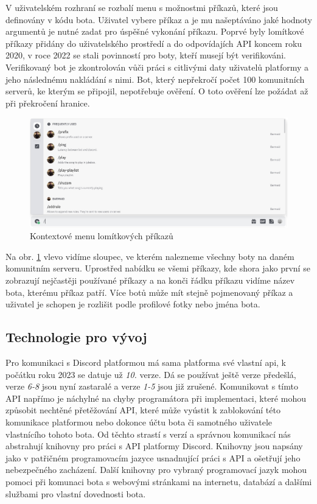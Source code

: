 \documentclass[
  program=inf,
biblatex=false,
sourcecodes=true,
joinlists=true,
  figures=true,
  tables=true,
  glossaries=true,
  index=false
]{kidiplom}
\begin{document}
V uživatelském rozhraní se rozbalí menu s možnostmi příkazů, které jsou definovány v kódu bota. Uživatel vybere příkaz a
je mu našeptáváno jaké hodnoty argumentů je nutné zadat pro úspěšné vykonání
příkazu. Poprvé byly lomítkové příkazy přidány do uživatelského prostředí a do odpovídajích
API koncem roku 2020, v roce 2022 se stali povinností pro boty, kteří musejí
být verifikováni. Verifikovaný bot je zkontrolován vůči práci s citlivými daty uživatelů platformy a jeho
následnému nakládání s nimi. Bot, který
nepřekročí počet 100 komunitních serverů, ke kterým se připojil, nepotřebuje ověření.
O toto ověření lze požádat až při překročení hranice.

\begin{figure}[h]
  \centering \includegraphics[scale=0.48]{slash}
  \caption{\label{slash_command}Kontextové menu lomítkových příkazů}
\end{figure}

Na obr. \ref{slash_command} vlevo vidíme sloupec, ve kterém nalezneme všechny
boty na daném komunitním serveru. Uprostřed nabídku se všemi příkazy, kde shora jako první
se zobrazují nejčastěji používané příkazy a na konči řádku příkazu vidíme název
bota, kterému příkaz patří. Více botů může mít stejně pojmenovaný příkaz a uživatel
je schopen je rozlišit podle profilové fotky nebo jména bota.

\subsection{Technologie pro vývoj}
Pro komunikaci s Discord platformou má sama platforma své vlastní \acrshort{api}, k počátku roku
2023 se datuje už {\it 10.} verze. Dá se používat ještě verze předešlá, verze {\it 6-8} jsou 
nyní zastaralé a verze {\it 1-5} jsou již zrušené. \cite{discordapi} Komunikovat s tímto API
napřímo je náchylné na chyby programátora při implementaci, které mohou způsobit
nechtěné přetěžování API, které může vyústit k zablokování této komunikace platformou
nebo dokonce účtu bota či samotného uživatele vlastnícího tohoto bota. Od těchto strastí
s verzí a správnou komunikací nás abstrahují knihovny pro práci s API platformy Discord.
Knihovny jsou napsány jako  v patřičném programovacím jazyce usnadnující 
práci s API a ošetřují jeho nebezpečného zacházení. Další knihovny pro vybraný programovací
jazyk mohou pomoci při komunaci bota s webovými stránkami na internetu, databází a 
dalšími službami pro vlastní dovednosti bota.
\end{document}
